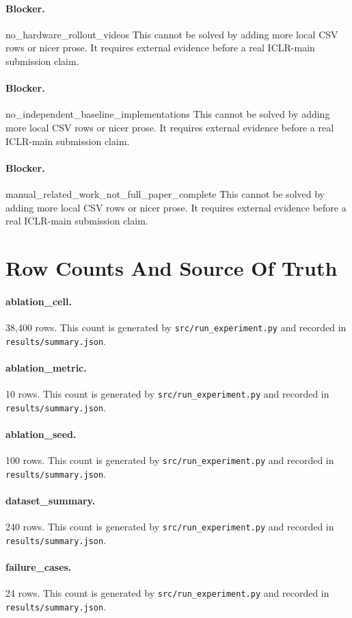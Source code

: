 \documentclass{article}
\begin{document}
\paragraph{Blocker.} no\_hardware\_rollout\_videos This cannot be solved by adding more local CSV rows or nicer prose. It requires external evidence before a real ICLR-main submission claim.
\paragraph{Blocker.} no\_independent\_baseline\_implementations This cannot be solved by adding more local CSV rows or nicer prose. It requires external evidence before a real ICLR-main submission claim.
\paragraph{Blocker.} manual\_related\_work\_not\_full\_paper\_complete This cannot be solved by adding more local CSV rows or nicer prose. It requires external evidence before a real ICLR-main submission claim.
\clearpage
\section{Row Counts And Source Of Truth}
\paragraph{ablation\_cell.} 38,400 rows. This count is generated by \texttt{src/run\_experiment.py} and recorded in \texttt{results/summary.json}.
\paragraph{ablation\_metric.} 10 rows. This count is generated by \texttt{src/run\_experiment.py} and recorded in \texttt{results/summary.json}.
\paragraph{ablation\_seed.} 100 rows. This count is generated by \texttt{src/run\_experiment.py} and recorded in \texttt{results/summary.json}.
\paragraph{dataset\_summary.} 240 rows. This count is generated by \texttt{src/run\_experiment.py} and recorded in \texttt{results/summary.json}.
\paragraph{failure\_cases.} 24 rows. This count is generated by \texttt{src/run\_experiment.py} and recorded in \texttt{results/summary.json}.
\end{document}

